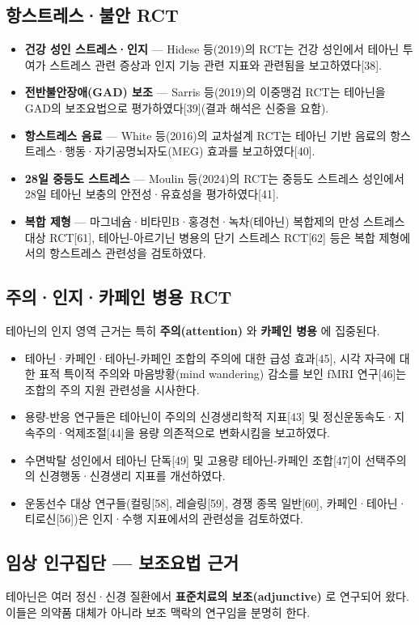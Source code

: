 \documentclass[11pt,oneside]{book}
\begin{document}
\subsection{항스트레스·불안 RCT}
\begin{itemize}[leftmargin=6mm,itemsep=1pt,topsep=2pt]
  \item \textbf{건강 성인 스트레스·인지} — Hidese 등(2019)의 RCT는 건강 성인에서 테아닌 투여가 스트레스 관련 증상과 인지 기능 관련 지표와 관련됨을 보고하였다[38].
  \item \textbf{전반불안장애(GAD) 보조} — Sarris 등(2019)의 이중맹검 RCT는 테아닌을 GAD의 보조요법으로 평가하였다[39](결과 해석은 신중을 요함).
  \item \textbf{항스트레스 음료} — White 등(2016)의 교차설계 RCT는 테아닌 기반 음료의 항스트레스·행동·자기공명뇌자도(MEG) 효과를 보고하였다[40].
  \item \textbf{28일 중등도 스트레스} — Moulin 등(2024)의 RCT는 중등도 스트레스 성인에서 28일 테아닌 보충의 안전성·유효성을 평가하였다[41].
  \item \textbf{복합 제형} — 마그네슘·비타민B·홍경천·녹차(테아닌) 복합제의 만성 스트레스 대상 RCT[61], 테아닌-아르기닌 병용의 단기 스트레스 RCT[62] 등은 복합 제형에서의 항스트레스 관련성을 검토하였다.
\end{itemize}
\subsection{주의·인지·카페인 병용 RCT}
테아닌의 인지 영역 근거는 특히 \textbf{주의(attention)} 와 \textbf{카페인 병용} 에 집중된다.

\begin{itemize}[leftmargin=6mm,itemsep=1pt,topsep=2pt]
  \item 테아닌·카페인·테아닌-카페인 조합의 주의에 대한 급성 효과[45], 시각 자극에 대한 표적 특이적 주의와 마음방황(mind wandering) 감소를 보인 fMRI 연구[46]는 조합의 주의 지원 관련성을 시사한다.
  \item 용량-반응 연구들은 테아닌이 주의의 신경생리학적 지표[43] 및 정신운동속도·지속주의·억제조절[44]을 용량 의존적으로 변화시킴을 보고하였다.
  \item 수면박탈 성인에서 테아닌 단독[49] 및 고용량 테아닌-카페인 조합[47]이 선택주의의 신경행동·신경생리 지표를 개선하였다.
  \item 운동선수 대상 연구들(컬링[58], 레슬링[59], 경쟁 종목 일반[60], 카페인·테아닌·티로신[56])은 인지·수행 지표에서의 관련성을 검토하였다.
\end{itemize}
\subsection{임상 인구집단 — 보조요법 근거}
테아닌은 여러 정신·신경 질환에서 \textbf{표준치료의 보조(adjunctive)} 로 연구되어 왔다. 이들은 의약품 대체가 아니라 보조 맥락의 연구임을 분명히 한다.
\end{document}
